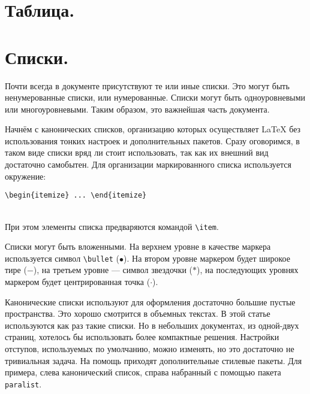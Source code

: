 \section{Таблица.}
\section{Списки.}
Почти всегда в документе присутствуют те или иные списки. Это могут быть ненумерованные
списки, или нумерованные. Списки могут быть одноуровневыми или многоуровневыми. 
Таким образом, это важнейшая часть документа.

Начнём с канонических списков, организацию которых осуществляет \LaTeX{} без использования
тонких настроек и дополнительных пакетов. Сразу оговоримся, в таком виде списки вряд ли
стоит использовать, так как их внешний вид достаточно самобытен. 
Для организации маркированного списка используется окружение:\\
\begin{fmpage}{.8\textwidth}
\verb|\begin{itemize} ... \end{itemize}|
\end{fmpage}
\\
При этом элементы списка предваряются командой \verb|\item|.

Списки могут быть вложенными. На верхнем уровне в качестве маркера используется символ
\verb|\bullet|  ($\bullet$). На втором уровне маркером будет широкое тире ($-$), на третьем уровне ---
символ звездочки ($*$),  на последующих уровнях маркером будет центрированная точка ($\cdot$).

Канонические списки используют для оформления достаточно большие пустые пространства.
Это хорошо смотрится в объемных текстах. В этой статье используются как раз такие
списки. Но в небольших документах, из одной-двух страниц, хотелось бы использовать
более компактные решения. Настройки отступов, используемых по умолчанию, можно изменять,
но это достаточно не тривиальная задача. На помощь приходят дополнительные стилевые 
пакеты. Для примера, слева канонический список, справа набранный с помощью пакета
\verb|paralist|.

